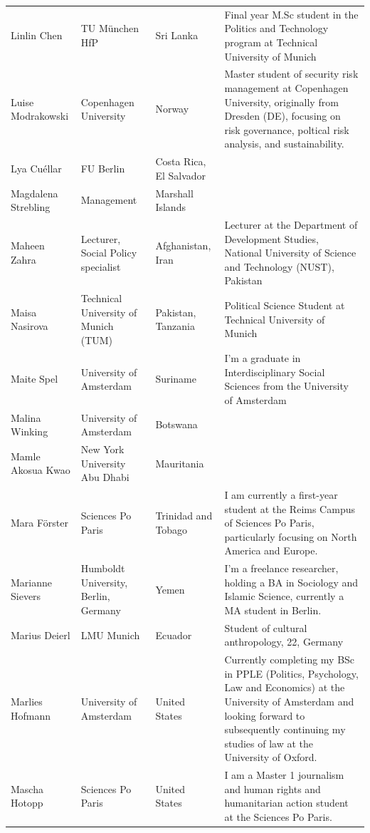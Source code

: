 \documentclass[]{article}
\begin{document}
\begin{longtable}{l>{\raggedright\arraybackslash}p{2cm}>{\raggedright\arraybackslash}p{2cm}>{\raggedright\arraybackslash}p{3cm}}
Linlin Chen & TU München HfP & Sri Lanka & Final year M.Sc student in the Politics and Technology program at Technical University of Munich\\
\rowcolor{gray!6}  Luise Modrakowski & Copenhagen University & Norway & Master student of security risk management at Copenhagen University, originally from Dresden (DE), focusing on risk governance, poltical risk analysis, and sustainability.\\
\addlinespace
Lya Cuéllar & FU Berlin & Costa Rica, El Salvador & \\
\rowcolor{gray!6}  Magdalena Strebling & Management & Marshall Islands & \\
Maheen Zahra & Lecturer, Social Policy specialist & Afghanistan, Iran & Lecturer at the Department of Development Studies, National University of Science and Technology (NUST), Pakistan\\
\rowcolor{gray!6}  Maisa Nasirova & Technical University of Munich (TUM) & Pakistan, Tanzania & Political Science Student at Technical University of Munich\\
Maite Spel & University of Amsterdam & Suriname & I'm a graduate in Interdisciplinary Social Sciences from the University of Amsterdam\\
\addlinespace
\rowcolor{gray!6}  Malina Winking & University of Amsterdam & Botswana & \\
Mamle Akosua Kwao & New York University Abu Dhabi & Mauritania & \\
\rowcolor{gray!6}  Mara Förster & Sciences Po Paris & Trinidad and Tobago & I am currently a first-year student at the Reims Campus of Sciences Po Paris, particularly focusing on North America and Europe.\\
Marianne Sievers & Humboldt University, Berlin, Germany & Yemen & I'm a freelance researcher, holding a BA in Sociology and Islamic Science, currently a MA student in Berlin.\\
\rowcolor{gray!6}  Marius Deierl & LMU Munich & Ecuador & Student of cultural anthropology, 22, Germany\\
\addlinespace
Marlies Hofmann & University of Amsterdam & United States & Currently completing my BSc in PPLE (Politics, Psychology, Law and Economics) at the University of Amsterdam and looking forward to subsequently continuing my studies of law at the University of Oxford.\\
\rowcolor{gray!6}  Mascha Hotopp & Sciences Po Paris & United States & I am a Master 1 journalism and human rights and humanitarian action student at the Sciences Po Paris.\\

\end{longtable}
\end{document}
